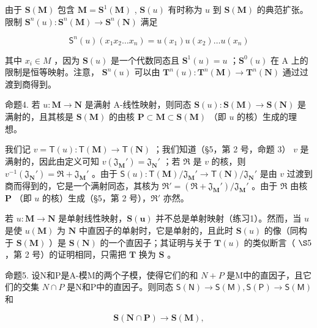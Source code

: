 由于 \(\mathbf{S}(\mathbf{M})\) 包含 \(\mathbf{M} = \mathbf{S}^1 (\mathbf{M})\) , \(\mathbf{S}(u)\) 有时称为 \(u\) 到 \(\mathbf{S}(\mathbf{M})\) 的典范扩张。限制 \(\mathbf{S}^n (u): \mathbf{S}^n (\mathbf{M}) \to \mathbf{S}^n (\mathbf{N})\) 满足

\[
\mathsf {S} ^ {n} (u) \left(x _ {1} x _ {2} \dots x _ {n}\right) = u \left(x _ {1}\right) u \left(x _ {2}\right) \dots u \left(x _ {n}\right)
\]

其中 \(x_{i} \in M\) ，因为 \(\mathbf{S}(u)\) 是一个代数同态且 \(\mathbf{S}^{1}(u) = u\) ；\(\mathbf{S}^{0}(u)\) 在 A 上的限制是恒等映射。注意， \(\mathbf{S}^{n}(u)\) 可以由 \(\mathbf{T}^{n}(u): \mathbf{T}^{n}(\mathbf{M}) \to \mathbf{T}^{n}(\mathbf{N})\) 通过过渡到商得到。

命题4. 若 \(u: \mathbf{M} \to \mathbf{N}\) 是满射 A-线性映射，则同态 \(\mathbf{S}(u): \mathbf{S}(\mathbf{M}) \to \mathbf{S}(\mathbf{N})\) 是满射的，且其核是 \(\mathbf{S}(\mathbf{M})\) 的由核 \(\mathbf{P} \subset \mathbf{M} \subset \mathbf{S}(\mathbf{M})\) （即 \(u\) 的核）生成的理想。

我们记 \(v = \mathsf{T}(u) \colon \mathsf{T}(\mathbf{M}) \to \mathsf{T}(\mathbf{N})\) ；我们知道（§5，第 2 号，命题 3） \(v\) 是满射的，因此由定义可知 \(v(\mathfrak{J}_{\mathbf{M}}') = \mathfrak{J}_{\mathbf{N}}'\) ；若 \(\Re\) 是 \(v\) 的核，则 \(v^{-1}(\mathfrak{J}_{\mathbf{N}}') = \Re + \mathfrak{J}_{\mathbf{M}}'\) 。由于 \(\mathsf{S}(u) \colon \mathsf{T}(\mathbf{M}) / \mathfrak{J}_{\mathbf{M}}' \to \mathsf{T}(\mathbf{N}) / \mathfrak{J}_{\mathbf{N}}'\) 是由 \(v\) 过渡到商而得到的，它是一个满射同态，其核为 \(\Re' = (\Re + \mathfrak{J}_{\mathbf{M}}') / \mathfrak{J}_{\mathbf{M}}'\) 。由于 \(\Re\) 由核 \(\mathbf{P}\) （即 \(u\) 的核）生成（§5，第 2 号），\(\Re'\) 亦然。

若 \(u: \mathbf{M} \to \mathbf{N}\) 是单射线性映射，\(\mathbf{S}(\mathbf{u})\) 并不总是单射映射（练习1）。然而，当 \(u\) 是使 \(u(\mathbf{M})\) 为 \(\mathbf{N}\) 中直因子的单射时，它是单射的，且此时 \(\mathbf{S}(u)\) 的像（同构于 \(\mathbf{S}(\mathbf{M})\) ）是 \(\mathbf{S}(\mathbf{N})\) 的一个直因子；其证明与关于 \(\mathbf{T}(u)\) 的类似断言（ \(\S 5\) ，第 2 号）的证明相同，只需把 \(\mathbf{T}\) 换为 \(\mathbf{S}\) 。

命题5. 设N和P是A-模M的两个子模，使得它们的和 \(N + P\) 是M中的直因子，且它们的交集 \(N \cap P\) 是N和P中的直因子。则同态 \(\mathsf{S}(\mathsf{N}) \to \mathsf{S}(\mathsf{M}), \mathsf{S}(\mathsf{P}) \to \mathsf{S}(\mathsf{M})\) 和

\[
\mathbf {S} (\mathbf {N} \cap \mathbf {P}) \rightarrow \mathbf {S} (\mathbf {M}),
\]

